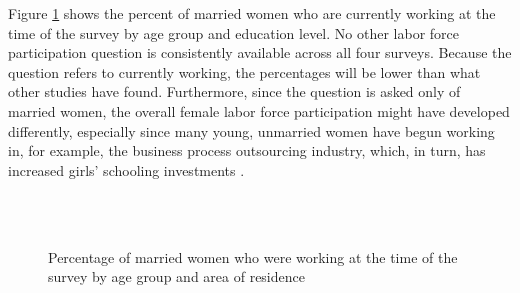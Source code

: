 \documentclass[12pt,letterpaper]{article}
\begin{document}
Figure \ref{fig:work_by_survey} shows the percent of married women who are 
currently working at the time of the survey by age group and education level.
No other labor force participation question is consistently available across all 
four surveys. 
Because the question refers to currently working, the percentages will be lower 
than what other studies have found. 
Furthermore, since the question is asked only of married women, the overall female labor 
force participation might have developed differently, especially since many young, 
unmarried women have begun working in, for example, the business process 
outsourcing industry, which, in turn, has increased girls' schooling investments
\citep{Jensen2012}.

\begin{figure}[!htpb]
\centering
{}
\\
\\
\caption{Percentage of married women who were working at the time of the 
survey by age group and area of residence}
\label{fig:work_by_survey}
\end{figure}
\end{document}
